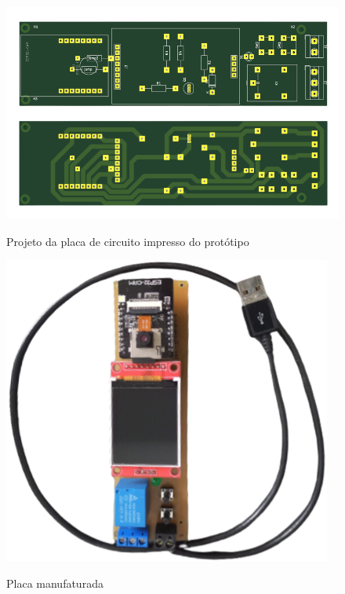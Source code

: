 \begin{figure}[h!]
    \centering
    \caption{Projeto da placa de circuito impresso do protótipo}
    \includegraphics[scale=0.35]{figuras/placa_pcb.png}
    \fonte{}%
    \label{fig:placapcb}
    \centering
\end{figure}

\begin{figure}[h!]
    \centering
    \caption{Placa manufaturada}
    \includegraphics[scale=0.45]{figuras/placa_montada.png}
    \fonte{}%
    \label{fig:placamanufaturada}
    \centering
\end{figure}